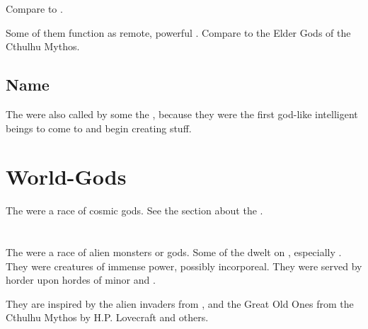 Compare to .

Some of them function as remote, powerful . Compare to the Elder Gods of the Cthulhu Mythos. 









\subsection{Name}
The \voyagers were also called by some the , because they were the first god-like intelligent beings to come to \Miith and begin creating stuff. 















\section{World-Gods}
The  were a race of cosmic gods.
See the section about the .
















\section{\XzaiShanns}
\index{\xzaishann}
The \xzaishanns{} were a race of alien monsters or gods. 
Some of the dwelt on \Miith, especially . 
They were creatures of immense power, possibly incorporeal. 
They were served by horder upon hordes of minor \mdaemons{} and \mdaemons.

They are inspired by the alien invaders from , and the Great Old Ones from the Cthulhu Mythos by H.P. Lovecraft and others. 

